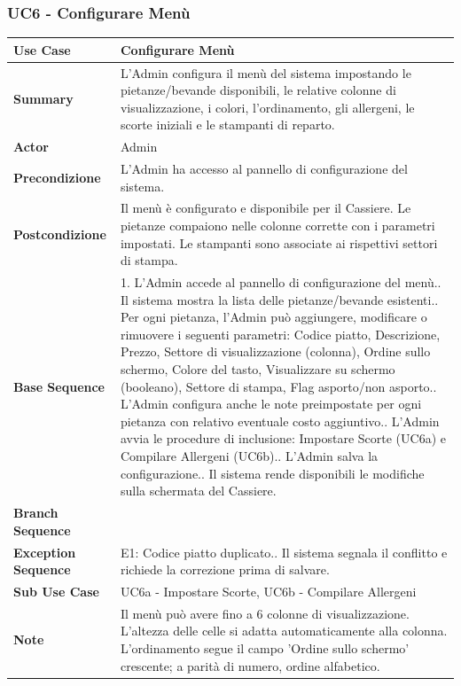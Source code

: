 \newpage 

\subsubsection*{UC6 - Configurare Menù}
\begin{center}
\begin{tabular}{|p{}|p{}|}
\hline
\textbf{Use Case} & Configurare Menù \\ \hline
\textbf{Summary} & L'Admin configura il menù del sistema impostando le pietanze/bevande disponibili, le relative colonne di visualizzazione, i colori, l'ordinamento, gli allergeni, le scorte iniziali e le stampanti di reparto. \\ \hline
\textbf{Actor} & Admin \\ \hline
\textbf{Precondizione} & L'Admin ha accesso al pannello di configurazione del sistema. \\ \hline
\textbf{Postcondizione} & Il menù è configurato e disponibile per il Cassiere. Le pietanze compaiono nelle colonne corrette con i parametri impostati. Le stampanti sono associate ai rispettivi settori di stampa. \\ \hline
\textbf{Base Sequence} & 1. L'Admin accede al pannello di configurazione del menù.\newline 2. Il sistema mostra la lista delle pietanze/bevande esistenti.\newline 3. Per ogni pietanza, l'Admin può aggiungere, modificare o rimuovere i seguenti parametri: Codice piatto, Descrizione, Prezzo, Settore di visualizzazione (colonna), Ordine sullo schermo, Colore del tasto, Visualizzare su schermo (booleano), Settore di stampa, Flag asporto/non asporto.\newline 4. L'Admin configura anche le note preimpostate per ogni pietanza con relativo eventuale costo aggiuntivo.\newline 5. L'Admin avvia le procedure di inclusione: Impostare Scorte (UC6a) e Compilare Allergeni (UC6b).\newline 6. L'Admin salva la configurazione.\newline 7. Il sistema rende disponibili le modifiche sulla schermata del Cassiere. \\ \hline
\textbf{Branch Sequence} & \\ \hline
\textbf{Exception Sequence} & E1: Codice piatto duplicato.\newline 6. Il sistema segnala il conflitto e richiede la correzione prima di salvare. \\ \hline
\textbf{Sub Use Case} & UC6a - Impostare Scorte, UC6b - Compilare Allergeni \\ \hline
\textbf{Note} & Il menù può avere fino a 6 colonne di visualizzazione. L'altezza delle celle si adatta automaticamente alla colonna. L'ordinamento segue il campo 'Ordine sullo schermo' crescente; a parità di numero, ordine alfabetico. \\ \hline
\end{tabular}
\end{center}

